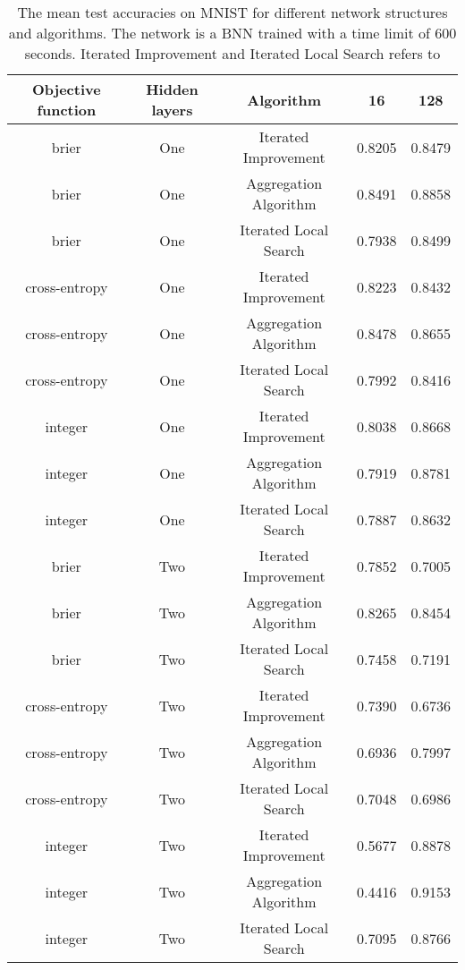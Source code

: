 \begin{center}
\begin{table}[H]
\centering
\begin{tabular}{|c|c|c|c|c|}
  \hline
Objective function & Hidden layers & Algorithm & 16 & 128 \\ 
  \hline
brier & One & Iterated Improvement & 0.8205 & 0.8479 \\ 
   \hline
brier & One & Aggregation Algorithm & 0.8491 & 0.8858 \\ 
   \hline
brier & One & Iterated Local Search & 0.7938 & 0.8499 \\ 
   \hline
cross-entropy & One & Iterated Improvement & 0.8223 & 0.8432 \\ 
   \hline
cross-entropy & One & Aggregation Algorithm & 0.8478 & 0.8655 \\ 
   \hline
cross-entropy & One & Iterated Local Search & 0.7992 & 0.8416 \\ 
   \hline
integer & One & Iterated Improvement & 0.8038 & 0.8668 \\ 
   \hline
integer & One & Aggregation Algorithm & 0.7919 & 0.8781 \\ 
   \hline
integer & One & Iterated Local Search & 0.7887 & 0.8632 \\ 
   \hline
brier & Two & Iterated Improvement & 0.7852 & 0.7005 \\ 
   \hline
brier & Two & Aggregation Algorithm & 0.8265 & 0.8454 \\ 
   \hline
brier & Two & Iterated Local Search & 0.7458 & 0.7191 \\ 
   \hline
cross-entropy & Two & Iterated Improvement & 0.7390 & 0.6736 \\ 
   \hline
cross-entropy & Two & Aggregation Algorithm & 0.6936 & 0.7997 \\ 
   \hline
cross-entropy & Two & Iterated Local Search & 0.7048 & 0.6986 \\ 
   \hline
integer & Two & Iterated Improvement & 0.5677 & 0.8878 \\ 
   \hline
integer & Two & Aggregation Algorithm & 0.4416 & 0.9153 \\ 
   \hline
integer & Two & Iterated Local Search & 0.7095 & 0.8766 \\ 
   \hline
\end{tabular}
\caption{The mean test accuracies on MNIST for different network structures and algorithms. The network is a
            BNN trained with a time limit of 600 seconds. Iterated Improvement and Iterated Local Search refers to
}
\end{table}
\end{center}
